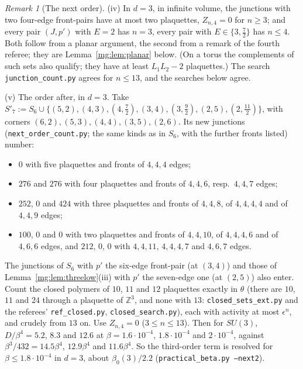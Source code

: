 \documentclass[11pt,a4paper]{article}
\theoremstyle{definition}
\theoremstyle{remark}
\newtheorem{remark}[theorem]{Remark}
\newcommand{\Z}{\mathbb{Z}}
\begin{document}
\begin{remark}[The next order]
(iv) In $d=3$, in infinite volume, the junctions with two four-edge front-pairs have at most two plaquettes, $Z_{n,4}=0$ for $n\ge3$; and every pair $(J,p')$ with $E=2$ has $n=3$, every
pair with $E\in\{3,\frac72\}$ has $n\le4$. Both follow from a planar argument, the second from a remark of the fourth referee; they are Lemma~\ref{mg:lem:planar} below. (On a torus the
complements of such sets also qualify; they have at least $L_1L_2-2$ plaquettes.) The search \texttt{junction\_count.py} agrees for $n\le13$, and the searches below agree.

(v) The order after, in $d=3$. Take $S'_7:=S_6\cup\{(5,2),(4,3),(4,\frac72),(3,4),(3,\frac92),(2,5),(2,\frac{11}2)\}$, with corners $(6,2),(5,3),(4,4),(3,5),(2,6)$. Its new
junctions (\texttt{next\_order\_count.py}; the same kinds as in $S_6$, with the further fronts listed) number:
\begin{itemize}
\item $0$ with five plaquettes and fronts of $4,4,4$ edges;
\item $276$ and $276$ with four plaquettes and fronts of $4,4,6$, resp.\ $4,4,7$ edges;
\item $252$, $0$ and $424$ with three plaquettes and fronts of $4,4,8$, of $4,4,4,4$ and of $4,4,9$ edges;
\item $100$, $0$ and $0$ with two plaquettes and fronts of $4,4,10$, of $4,4,4,6$ and of $4,6,6$ edges, and $212$, $0$, $0$ with $4,4,11$, $4,4,4,7$ and $4,6,7$ edges.
\end{itemize}
The junctions of $S_6$ with $p'$ the six-edge front-pair (at $(3,4)$) and those of Lemma~\ref{mg:lem:threelow}(iii) with $p'$ the seven-edge one (at $(2,5)$) also enter. Count the closed
polymers of $10$, $11$ and $12$ plaquettes exactly in $\theta$ (there are $10$, $11$ and $24$ through a plaquette of $\Z^3$, and none with $13$: \texttt{closed\_sets\_ext.py} and
the referees' \texttt{ref\_closed.py}, \texttt{closed\_search.py}), each with activity at most $\epsilon^n$, and crudely from $13$ on. Use $Z_{n,4}=0$ ($3\le n\le13$). Then for $SU(3)$, $D/\beta^4=5.2$, $8.3$ and $12.6$ at $\beta=1.6\cdot10^{-4}$,
$1.8\cdot10^{-4}$ and $2\cdot10^{-4}$, against $\beta^3/432=14.5\beta^4$, $12.9\beta^4$ and $11.6\beta^4$. So the third-order term is resolved for $\beta\le1.8\cdot10^{-4}$ in $d=3$, about $\beta_0(3)/2.2$
(\texttt{practical\_beta.py --next2}).


\end{remark}
\end{document}
